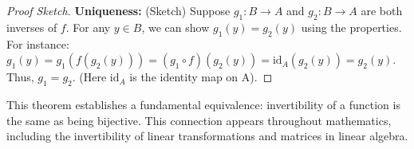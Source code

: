 \documentclass[11pt]{article}
\theoremstyle{definition}
\theoremstyle{remark}
\begin{document}
\begin{proof}[Proof Sketch]
\textbf{Uniqueness:} (Sketch) Suppose $g_1: B \to A$ and $g_2: B \to A$ are both inverses of $f$. For any $y \in B$, we can show $g_1(y) = g_2(y)$ using the properties. For instance: $g_1(y) = g_1(f(g_2(y))) = (g_1 \circ f)(g_2(y)) = \text{id}_A(g_2(y)) = g_2(y)$. Thus, $g_1=g_2$. (Here $\text{id}_A$ is the identity map on A).
\end{proof}

This theorem establishes a fundamental equivalence: invertibility of a function is the same as being bijective. This connection appears throughout mathematics, including the invertibility of linear transformations and matrices in linear algebra.
\end{document}

